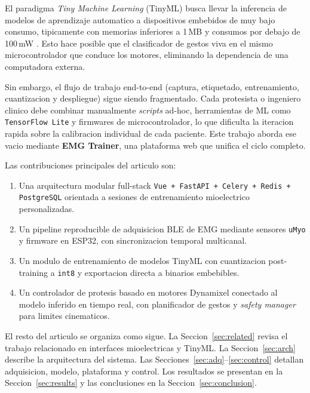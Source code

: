 \documentclass[11pt,a4paper]{article}
\begin{document}
El paradigma \emph{Tiny Machine Learning} (TinyML) busca llevar la
inferencia de modelos de aprendizaje automatico a dispositivos
embebidos de muy bajo consumo, tipicamente con memorias inferiores a
1\,MB y consumos por debajo de 100\,mW \cite{warden2019tinyml}. Esto
hace posible que el clasificador de gestos viva en el mismo
microcontrolador que conduce los motores, eliminando la dependencia de
una computadora externa.

Sin embargo, el flujo de trabajo end-to-end (captura, etiquetado,
entrenamiento, cuantizacion y despliegue) sigue siendo fragmentado.
Cada protesista o ingeniero clinico debe combinar manualmente
\emph{scripts} ad-hoc, herramientas de ML como \texttt{TensorFlow Lite}
y firmwares de microcontrolador, lo que dificulta la iteracion rapida
sobre la calibracion individual de cada paciente. Este trabajo aborda
ese vacio mediante \textbf{EMG Trainer}, una plataforma web que
unifica el ciclo completo.

Las contribuciones principales del articulo son:

\begin{enumerate}
  \item Una arquitectura modular full-stack \texttt{Vue + FastAPI +
        Celery + Redis + PostgreSQL} orientada a sesiones de
        entrenamiento mioelectrico personalizadas.
  \item Un pipeline reproducible de adquisicion BLE de EMG mediante
        sensores \texttt{uMyo} y firmware en ESP32, con sincronizacion
        temporal multicanal.
  \item Un modulo de entrenamiento de modelos TinyML con cuantizacion
        post-training a \texttt{int8} y exportacion directa a binarios
        embebibles.
  \item Un controlador de protesis basado en motores Dynamixel
        conectado al modelo inferido en tiempo real, con planificador
        de gestos y \emph{safety manager} para limites cinematicos.
\end{enumerate}

El resto del articulo se organiza como sigue. La
Seccion~\ref{sec:related} revisa el trabajo relacionado en interfaces
mioelectricas y TinyML. La Seccion~\ref{sec:arch} describe la
arquitectura del sistema. Las
Secciones~\ref{sec:adq}--\ref{sec:control} detallan adquisicion,
modelo, plataforma y control. Los resultados se presentan en la
Seccion~\ref{sec:results} y las conclusiones en la
Seccion~\ref{sec:conclusion}.

\end{document}
